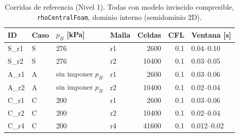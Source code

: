\begin{table}[htbp]
\centering
\caption{Corridas de referencia (Nivel 1). Todas con modelo inviscido compresible, \texttt{rhoCentralFoam}, dominio interno (semidominio 2D).}
\label{tab:corridas}
\small
\begin{tabular}{llllrrl}
\hline
ID & Caso & $p_B$ [kPa] & Malla & Celdas & CFL & Ventana [s] \\
\hline
S\_r1 & S & 276 & r1 & 2600 & 0.1 & 0.04--0.10 \\
S\_r2 & S & 276 & r2 & 10400 & 0.1 & 0.03--0.05 \\
A\_r1 & A & sin imponer $p_B$ & r1 & 2600 & 0.1 & 0.03--0.06 \\
A\_r2 & A & sin imponer $p_B$ & r2 & 10400 & 0.1 & 0.02--0.04 \\
C\_r1 & C & 200 & r1 & 2600 & 0.1 & 0.03--0.06 \\
C\_r2 & C & 200 & r2 & 10400 & 0.1 & 0.02--0.04 \\
C\_r4 & C & 200 & r4 & 41600 & 0.1 & 0.012--0.02 \\
\hline
\end{tabular}
\end{table}
